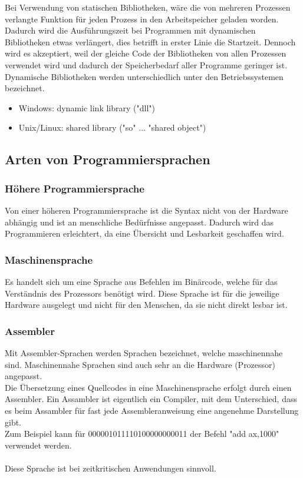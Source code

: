 \documentclass[12pt,a4paper]{report}
\begin{document}
\begin{onehalfspace}
\begin{itemize}
Bei Verwendung von statischen Bibliotheken, wäre die von mehreren Prozessen verlangte Funktion für jeden Prozess in den Arbeitspeicher geladen worden.\\

Dadurch wird die Ausführungszeit bei Programmen mit dynamischen Bibliotheken etwas verlängert, dies betrifft in erster Linie die Startzeit. Dennoch wird es akzeptiert, weil der gleiche Code der Bibliotheken von allen Prozessen verwendet wird und dadurch der Speicherbedarf aller Programme geringer ist.
\\Dynamische Bibliotheken werden unterschiedlich unter den Betriebssystemen bezeichnet.
\begin{itemize}
\item Windows: dynamic link library ("{}dll"{})
\item Unix/Linux: shared library ("{}so"{} ... "{}shared object"{})
\end{itemize}

\end{itemize}

\subsection{Arten von Programmiersprachen}
\subsubsection{Höhere Programmiersprache} 
Von einer höheren Programmiersprache ist die Syntax nicht von der Hardware abhängig und ist an menschliche Bedürfnisse angepasst. Dadurch wird das Programmieren erleichtert, da eine Übersicht und Lesbarkeit geschaffen wird.

\subsubsection{Maschinensprache}
Es handelt sich um eine Sprache aus Befehlen im Binärcode, welche für das Verständnis des Prozessors benötigt wird. Diese Sprache ist für die jeweilige Hardware ausgelegt und nicht für den Menschen, da sie nicht direkt lesbar ist.

\subsubsection{Assembler}
Mit Assembler-Sprachen werden Sprachen bezeichnet, welche maschinennahe sind. Maschinennahe Sprachen sind auch sehr an die Hardware (Prozessor) angepasst.\\
Die Übersetzung eines Quellcodes in eine Maschinensprache erfolgt durch einen Assembler. Ein Assambler ist eigentlich ein Compiler, mit dem Unterschied, dass es beim Assambler für fast jede Assembleranweisung eine angenehme Darstellung gibt.
\\Zum Beispiel kann für 000001011110100000000011 der Befehl "{}add ax,1000"{} verwendet werden.\\
\\Diese Sprache ist bei zeitkritischen Anwendungen sinnvoll.


\end{onehalfspace}
\end{document}
